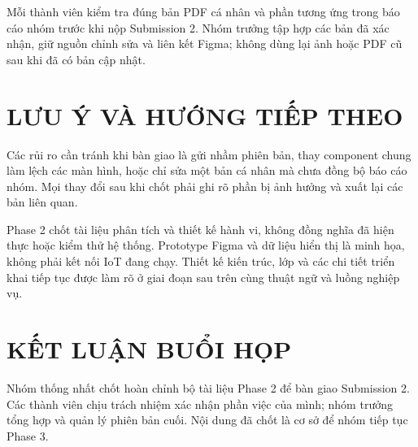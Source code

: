 \documentclass[10pt,a4paper]{article}
\begin{document}
Mỗi thành viên kiểm tra đúng bản PDF cá nhân và phần tương ứng trong báo cáo nhóm trước khi nộp Submission 2. Nhóm trưởng tập hợp các bản đã xác nhận, giữ nguồn chỉnh sửa và liên kết Figma; không dùng lại ảnh hoặc PDF cũ sau khi đã có bản cập nhật.

\section{LƯU Ý VÀ HƯỚNG TIẾP THEO}
Các rủi ro cần tránh khi bàn giao là gửi nhầm phiên bản, thay component chung làm lệch các màn hình, hoặc chỉ sửa một bản cá nhân mà chưa đồng bộ báo cáo nhóm. Mọi thay đổi sau khi chốt phải ghi rõ phần bị ảnh hưởng và xuất lại các bản liên quan.

Phase 2 chốt tài liệu phân tích và thiết kế hành vi, không đồng nghĩa đã hiện thực hoặc kiểm thử hệ thống. Prototype Figma và dữ liệu hiển thị là minh họa, không phải kết nối IoT đang chạy. Thiết kế kiến trúc, lớp và các chi tiết triển khai tiếp tục được làm rõ ở giai đoạn sau trên cùng thuật ngữ và luồng nghiệp vụ.

\section{KẾT LUẬN BUỔI HỌP}
Nhóm thống nhất chốt hoàn chỉnh bộ tài liệu Phase 2 để bàn giao Submission 2. Các thành viên chịu trách nhiệm xác nhận phần việc của mình; nhóm trưởng tổng hợp và quản lý phiên bản cuối. Nội dung đã chốt là cơ sở để nhóm tiếp tục Phase 3.
\end{document}
